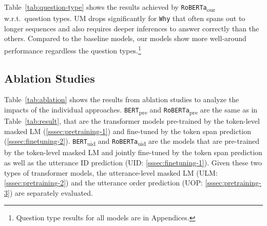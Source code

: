 \documentclass[11pt,a4paper]{article}
\newcommand{\textsec}[1]{\textsection\ref{#1}}
\begin{document}
\noindent Table~\ref{tab:question-type} shows the results achieved by \texttt{RoBERTa}\textsubscript{our} w.r.t.\ question types.
UM drops significantly for \texttt{Why} that often spans out to longer sequences and also requires deeper inferences to answer correctly than the others.
Compared to the baseline models, our models show more well-around performance regardless the question types.\footnote{Question type results for all models are in Appendices.}


\subsection{Ablation Studies}

Table~\ref{tab:ablation} shows the results from ablation studies to analyze the impacts of the individual approaches.
\texttt{BERT}\textsubscript{pre} and \texttt{RoBERTa}\textsubscript{pre} are the same as in Table~\ref{tab:result}, that are the transformer models pre-trained by the token-level masked LM (\textsec{sssec:pretraining-1}) and fine-tuned by the token span prediction (\textsec{sssec:finetuning-2}).
\texttt{BERT}\textsubscript{uid} and \texttt{RoBERTa}\textsubscript{uid} are the models that are pre-trained by the token-level masked LM and jointly fine-tuned by the token span prediction as well as the utterance ID prediction (UID: \textsec{sssec:finetuning-1}).
Given these two types of transformer models, the utterance-level masked LM (ULM: \textsec{sssec:pretraining-2}) and the utterance order prediction (UOP: \textsec{sssec:pretraining-3}) are separately evaluated.
\end{document}
